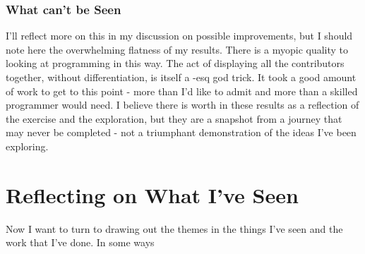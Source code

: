 \documentclass[a4paper,man,natbib,floatsintext]{apa6}
\begin{document}

  \subsubsection{What can't be Seen}
  I'll reflect more on this in my discussion on possible improvements, but I should note here the overwhelming flatness of my results. There is a myopic quality to looking at programming in this way. The act of displaying all the contributors together, without differentiation, is itself a \citet{Haraway1988-nh}-esq god trick. It took a good amount of work to get to this point - more than I'd like to admit and more than a skilled programmer would need. I believe there is worth in these results as a reflection of the exercise and the exploration, but they are a snapshot from a journey that may never be completed - not a triumphant demonstration of the ideas I've been exploring.
  \newpage

   \section{Reflecting on What I've Seen}
   Now I want to turn to drawing out the themes in the things I've seen and the work that I've done. In some ways 

\end{document}
